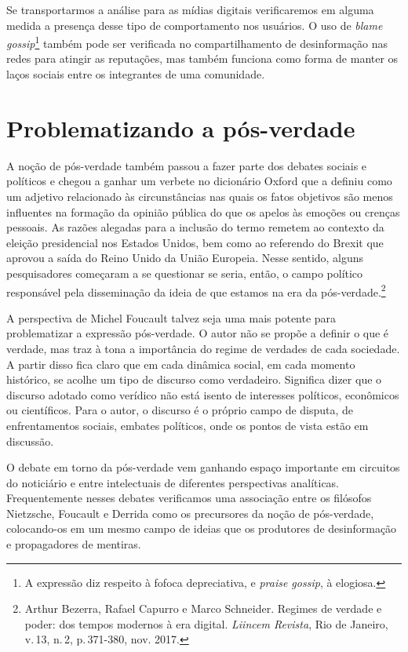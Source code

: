 Se transportarmos a análise para as mídias digitais verificaremos em
alguma medida a presença desse tipo de comportamento nos usuários. O uso
de \textit{blame gossip}\footnote{A expressão diz respeito à fofoca depreciativa, e \textit{praise gossip}, à elogiosa.} também pode ser verificada no compartilhamento de
desinformação nas redes para atingir as reputações, mas também funciona
como forma de manter os laços sociais entre os integrantes de uma
comunidade.

\section{Problematizando a pós-verdade}

A noção de pós-verdade também passou a fazer parte dos debates sociais e
políticos e chegou a ganhar um verbete no dicionário Oxford que a
definiu como um adjetivo relacionado às circunstâncias nas quais os
fatos objetivos são menos influentes na formação da opinião pública do
que os apelos às emoções ou crenças pessoais. As razões alegadas para a
inclusão do termo remetem ao contexto da eleição presidencial nos
Estados Unidos, bem como ao referendo do Brexit que aprovou a
saída do Reino Unido da União Europeia. Nesse sentido, alguns
pesquisadores começaram a se questionar se seria, então, o campo
político responsável pela disseminação da ideia de que estamos na era da
pós-verdade.\footnote{Arthur Bezerra, Rafael Capurro e Marco Schneider. Regimes de
verdade e poder: dos tempos modernos à era digital. \textit{Liincem Revista}, Rio de Janeiro, v.\,13, n.\,2, p.\,371-380, nov. 2017.}

A perspectiva de Michel Foucault talvez seja uma mais potente para
problematizar a expressão pós-verdade. O autor não se propõe a definir o
que é verdade, mas traz à tona a importância do regime de verdades de
cada sociedade. A partir disso fica claro que em cada dinâmica social,
em cada momento histórico, se acolhe um tipo de discurso como
verdadeiro. Significa dizer que o discurso adotado como verídico não
está isento de interesses políticos, econômicos ou científicos. Para o
autor, o discurso é o próprio campo de disputa, de enfrentamentos
sociais, embates políticos, onde os pontos de vista estão em discussão.

O debate em torno da pós-verdade vem ganhando espaço importante em
circuitos do noticiário e entre intelectuais de diferentes perspectivas
analíticas. Frequentemente nesses debates verificamos uma associação
entre os filósofos Nietzsche, Foucault e Derrida como os precursores da
noção de pós-verdade, colocando-os em um mesmo campo de ideias que os
produtores de desinformação e propagadores de mentiras.

